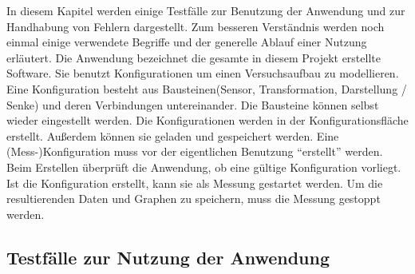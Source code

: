 \documentclass[parskip=full]{scrartcl}
\begin{document}
In diesem Kapitel werden einige Testfälle zur Benutzung der Anwendung und zur Handhabung von Fehlern dargestellt. Zum besseren Verständnis werden noch einmal einige verwendete Begriffe und der generelle Ablauf einer Nutzung erläutert. Die Anwendung bezeichnet die gesamte in diesem Projekt erstellte Software. Sie benutzt Konfigurationen um einen Versuchsaufbau zu modellieren. Eine Konfiguration besteht aus Bausteinen(Sensor, Transformation, Darstellung / Senke) und deren Verbindungen untereinander. Die Bausteine können selbst wieder eingestellt werden. Die Konfigurationen werden in der Konfigurationsfläche erstellt. Außerdem können sie geladen und gespeichert werden. Eine (Mess-)Konfiguration muss vor der eigentlichen Benutzung "`erstellt"' werden. Beim Erstellen überprüft die Anwendung, ob eine gültige Konfiguration vorliegt. Ist die Konfiguration erstellt, kann sie als Messung gestartet werden. Um die resultierenden Daten und Graphen zu speichern, muss die Messung gestoppt werden.

\subsection{Testfälle zur Nutzung der Anwendung}
\end{document}

